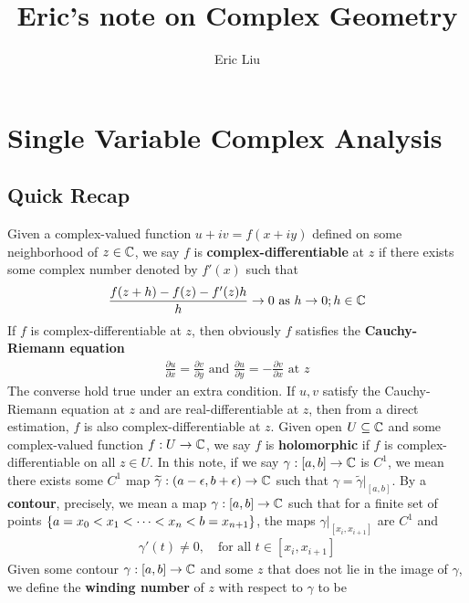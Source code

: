 \documentclass{report}
\title{Eric's note on Complex Geometry}
\author{Eric Liu}
\date{}
\begin{document}
\maketitle
\newpage%

\tableofcontents
\pagebreak
\chapter{Single Variable Complex Analysis}
\section{Quick Recap}
Given a complex-valued function $u+iv=f(x+iy)$ defined on some neighborhood of $z\in\mathbb{C}$, we say $f$ is \textbf{complex-differentiable} at $z$ if there exists some complex number denoted by $f'(x)$ such that 
\begin{align*}
\frac{f(z+h)-f(z)-f'(z)h}{h}\to 0 \text{ as }h\to 0;h \in\mathbb{C}
\end{align*}
If $f$ is complex-differentiable at $z$, then obviously $f$ satisfies the \textbf{Cauchy-Riemann equation}
\begin{align*}
\frac{\partial u}{\partial x}= \frac{\partial v}{\partial y} \text{ and }\frac{\partial u}{\partial y}= -\frac{\partial v}{\partial x}\text{ at }z
\end{align*}
The converse hold true under an extra condition. If $u,v$ satisfy the Cauchy-Riemann equation at $z$ and are real-differentiable at $z$, then from a direct estimation, $f$ is also complex-differentiable at $z$. Given open $U\subseteq \mathbb{C}$ and some complex-valued function $f:U\rightarrow \mathbb{C}$, we say $f$ is \textbf{holomorphic} if $f$ is complex-differentiable on all $z \in U$. In this note, if we say $\gamma :[a,b]\rightarrow \mathbb{C}$ is $C^1$, we mean there exists some  $C^1$ map $\widetilde{\gamma }:(a-\epsilon ,b+\epsilon )\rightarrow \mathbb{C} $ such that $\gamma =\tilde{\gamma }|_{[a,b]} $. By a \textbf{contour}, precisely, we mean a map $\gamma :[ a,b]\rightarrow \mathbb{C}$ such that for a finite set of points  $\{ a=x_0<x_1<\cdots <x_n < b=x_{n+1} \}$, the maps $\gamma  |_{[x_i,x_{i+1}]}$ are $C^1$ and 
\begin{align*}
\gamma'(t)\neq 0,\quad\text{for all }t \in [x_{i},x_{i+1}]
\end{align*}
Given some contour $\gamma :[a,b]\rightarrow \mathbb{C}$ and some $z$ that does not lie in the image of $\gamma $, we define the \textbf{winding number} of $z$ with respect to  $\gamma $ to be 
\end{document}

